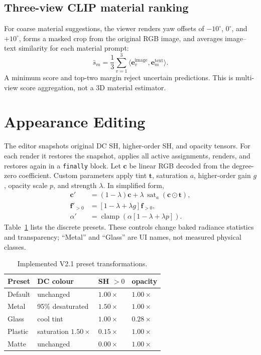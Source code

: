 \documentclass[10pt,twocolumn,a4paper]{article}
\begin{document}
\subsection{Three-view CLIP material ranking}
For coarse material suggestions, the viewer renders yaw offsets of
$-10^\circ$, $0^\circ$, and $+10^\circ$, forms a masked crop from the original
RGB image, and averages image--text similarity for each material prompt:
\begin{equation}
  \bar{s}_m=\frac{1}{3}\sum_{v=1}^{3}
  \langle \mathbf{e}^{\mathrm{image}}_v,\mathbf{e}^{\mathrm{text}}_m\rangle.
\end{equation}
A minimum score and top-two margin reject uncertain predictions. This is
multi-view score aggregation, not a 3D material estimator.

\section{Appearance Editing}
The editor snapshots original DC SH, higher-order SH, and opacity tensors. For
each render it restores the snapshot, applies all active assignments, renders,
and restores again in a \texttt{finally} block. Let $\mathbf{c}$ be linear RGB
decoded from the degree-zero coefficient. Custom parameters apply tint
$\mathbf{t}$, saturation $a$, higher-order gain $g$, opacity scale $p$, and
strength $\lambda$. In simplified form,
\begin{align}
 \mathbf{c}' &= (1-\lambda)\mathbf{c}+\lambda\,
   \operatorname{sat}_a(\mathbf{c}\odot\mathbf{t}),\\
 \mathbf{f}'_{>0} &= [1-\lambda+\lambda g]\mathbf{f}_{>0},\\
 \alpha' &= \operatorname{clamp}(\alpha[1-\lambda+\lambda p]).
\end{align}
Table~\ref{tab:presets} lists the discrete presets. These controls change baked
radiance statistics and transparency; ``Metal'' and ``Glass'' are UI names,
not measured physical classes.

\begin{table}[h]
\centering
\caption{Implemented V2.1 preset transformations.}
\label{tab:presets}
\begin{tabular}{llll}
\toprule
Preset & DC colour & SH $>0$ & opacity\\
\midrule
Default & unchanged & $1.00\times$ & $1.00\times$\\
Metal & 95\% desaturated & $1.50\times$ & $1.00\times$\\
Glass & cool tint & $1.00\times$ & $0.28\times$\\
Plastic & saturation $1.50\times$ & $0.15\times$ & $1.00\times$\\
Matte & unchanged & $0.00\times$ & $1.00\times$\\
\bottomrule
\end{tabular}
\end{table}
\end{document}
